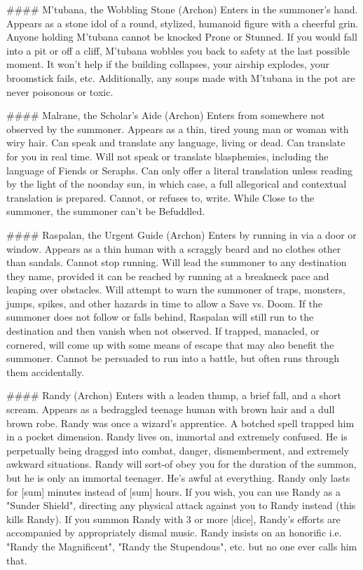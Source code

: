 ####  M'tubana, the Wobbling Stone (Archon)
Enters in the summoner's hand. Appears as a stone idol of a round, stylized, humanoid figure with a cheerful grin. Anyone holding M'tubana cannot be knocked Prone or Stunned.  If you would fall into a pit or off a cliff, M'tubana wobbles you back to safety at the last possible moment. It won't help if the building collapses, your airship explodes, your broomstick fails, etc. Additionally, any soups made with M'tubana in the pot are never poisonous or toxic.


####  Malrane, the Scholar's Aide (Archon)
Enters from somewhere not observed by the summoner. Appears as a thin, tired young man or woman with wiry hair. Can speak and translate any language, living or dead.  Can translate for you in real time. Will not speak or translate blasphemies, including the language of Fiends or Seraphs.  Can only offer a literal translation unless reading by the light of the noonday sun, in which case, a full allegorical and contextual translation is prepared. Cannot, or refuses to, write.  While Close to the summoner, the summoner can't be Befuddled.


####  Raspalan, the Urgent Guide (Archon)
Enters by running in via a door or window. Appears as a thin human with a scraggly beard and no clothes other than sandals. Cannot stop running. Will lead the summoner to any destination they name, provided it can be reached by running at a breakneck pace and leaping over obstacles. Will attempt to warn the summoner of traps, monsters, jumps, spikes, and other hazards in time to allow a Save vs. Doom. If the summoner does not follow or falls behind, Raspalan will still run to the destination and then vanish when not observed. If trapped, manacled, or cornered, will come up with some means of escape that may also benefit the summoner. Cannot be persuaded to run into a battle, but often runs through them accidentally.




#### Randy (Archon)
Enters with a leaden thump, a brief fall, and a short scream. Appears as a bedraggled teenage human with brown hair and a dull brown robe. Randy was once a wizard's apprentice. A botched spell trapped him in a pocket dimension. Randy lives on, immortal and extremely confused. He is perpetually being dragged into combat, danger, dismemberment, and extremely awkward situations. Randy will sort-of obey you for the duration of the summon, but he is only an immortal teenager. He's awful at everything. Randy only lasts for [sum] minutes instead of [sum] hours.  If you wish, you can use Randy as a "Sunder Shield", directing any physical attack against you to Randy instead (this kills Randy).  If you summon Randy with 3 or more [dice], Randy's efforts are accompanied by appropriately dismal music.  Randy insists on an honorific i.e. "Randy the Magnificent", "Randy the Stupendous", etc. but no one ever calls him that.


